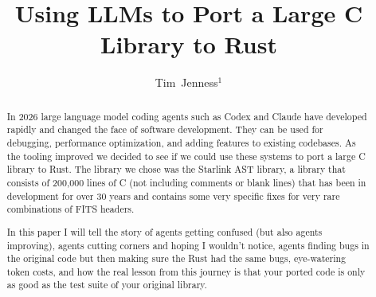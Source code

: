 \documentclass[11pt,twoside]{article}
\begin{document}
\title{Using LLMs to Port a Large C Library to Rust}


\author{Tim~Jenness$^1$}





\begin{abstract}
In 2026 large language model coding agents such as Codex and Claude have developed rapidly and changed the face of software development. They can be used for debugging, performance optimization, and adding features to existing codebases. As the tooling improved we decided to see if we could use these systems to port a large C library to Rust. The library we chose was the Starlink AST library, a library that consists of 200,000 lines of C (not including comments or blank lines) that has been in development for over 30 years and contains some very specific fixes for very rare combinations of FITS headers.

In this paper I will tell the story of agents getting confused (but also agents improving), agents cutting corners and hoping I wouldn't notice, agents finding bugs in the original code but then making sure the Rust had the same bugs, eye-watering token costs, and how the real lesson from this journey is that your ported code is only as good as the test suite of your original library.
\end{abstract}
\end{document}
